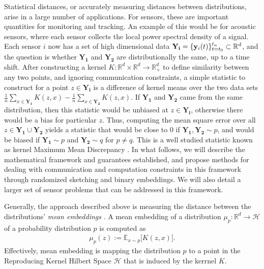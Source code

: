 Statistical distances, or accurately measuring distances between distributions, arise in a large number of applications.  For sensors, these are important quantities for monitoring and tracking.
An example of this would be for acoustic sensors, where each sensor collects the local power spectral density of a signal.  Each sensor $i$ now has a set of high dimensional data $\mathbf{Y_i}=\{\mathbf{y}_i(t)\}_{t=t_0}^{t_n}\subset \mathbb{R}^d$, and the question is whether $\mathbf{Y_1}$ and $\mathbf{Y_2}$ are distributionally the same, up to a time shift.  After constructing a kernel $K: \mathbb{R}^d\times \mathbb{R}^d \rightarrow \mathbb{R}^d_+$ to define similarity between any two points, and ignoring communication constraints, a simple statistic to construct for a point $z \in \mathbf{Y_i}$ is a difference of kernel means over the two data sets $\frac{1}{n}\sum_{x\in \mathbf{Y_1}} K(z,x) - \frac{1}{n}\sum_{x\in \mathbf{Y_2}} K(z,x)$.  If $\mathbf{Y_1}$ and $\mathbf{Y_2}$ came from the same distribution, then this statistic would be unbiased at $z\in \mathbf{Y_i}$, otherwise there would be a bias for particular $z$.  Thus, computing the mean square error over all $z\in \mathbf{Y_1}\cup \mathbf{Y_2}$ yields a statistic that would be close to 0 if $\mathbf{Y_1},\mathbf{Y_2}\sim p$, and would be biased if $\mathbf{Y_1}\sim p$ and $\mathbf{Y_2}\sim q$ for $p\neq q$.  This is a well studied statistic known as kernel Maximum Mean Discrepancy \cite{}.  In what follows, we will describe the mathematical framework and guarantees established, and propose methods for dealing with communication and computation constraints in this framework through randomized sketching and binary embeddings.  We will also detail a larger set of sensor problems that can be addressed in this framework.


Generally, the approach described above is measuring the distance between the distributions' \emph{mean embeddings} \cite{muandet2017kernel}.  A mean embedding of a distribution $\mu_p:\mathbb{R}^d\rightarrow \mathcal{H}$ of a probability distribution $p$ is computed as
\begin{align*}
    \mu_p(z) := \mathbb{E}_{x\sim p} \big[K(z,x)\big].
\end{align*}
Effectively, mean embedding is mapping the distribution $p$ to a point in the Reproducing Kernel Hilbert Space $\mathcal{H}$ that is induced by the kerrnel $K$.

